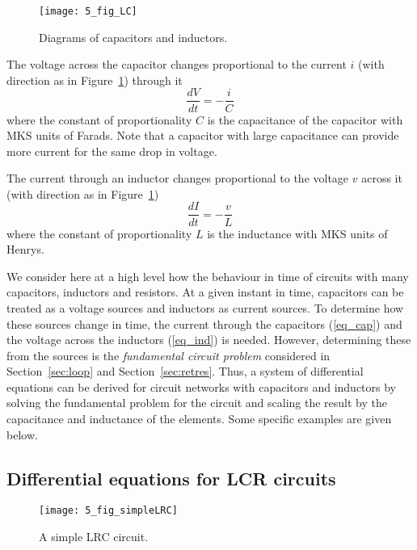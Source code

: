 \begin{figure}
\centerline{\texttt{[image: 5\_fig\_LC]}}
\caption{Diagrams of capacitors and inductors. 
\label{fig_LC}}
\end{figure}

The voltage across the capacitor changes proportional to the current $i$ 
(with direction as in Figure~\ref{fig_LC}) through it 
\begin{equation}
\label{eq_cap}
\frac{dV}{dt} = - \frac{i}{C} 
\end{equation}
where the constant of proportionality $C$ is the capacitance of the capacitor
with MKS units of Farads. Note that a capacitor with large capacitance can 
provide more current for the same drop in voltage. 

The current through an inductor changes proportional to the voltage 
$v$ across it (with direction as in Figure~\ref{fig_LC}) 
\begin{equation}
\label{eq_ind}
\frac{dI}{dt} = - \frac{v}{L}
\end{equation}
where the constant of proportionality $L$ is the inductance with MKS 
units of Henrys. 

We consider here at a high level how the behaviour in time of 
circuits with many capacitors, inductors and resistors. At a given 
instant in time, capacitors can be treated as a voltage sources and 
inductors as current sources. To determine how these sources change 
in time, the current through the capacitors (\ref{eq_cap}) and the 
voltage across the inductors (\ref{eq_ind}) is needed. However, 
determining these from the sources is the {\em fundamental circuit 
problem} considered in Section~\ref{sec:loop} and Section~\ref{sec:retres}.
Thus, a system of differential equations can be derived for circuit 
networks with capacitors and inductors by solving the fundamental 
problem for the circuit and scaling the result by the capacitance and 
inductance of the elements. Some specific examples are given below. 

\subsection{Differential equations for LCR circuits}

\begin{figure}
\centerline{\texttt{[image: 5\_fig\_simpleLRC]}}
\caption{A simple LRC circuit.
\label{fig_simpleLRC}}
\end{figure}

